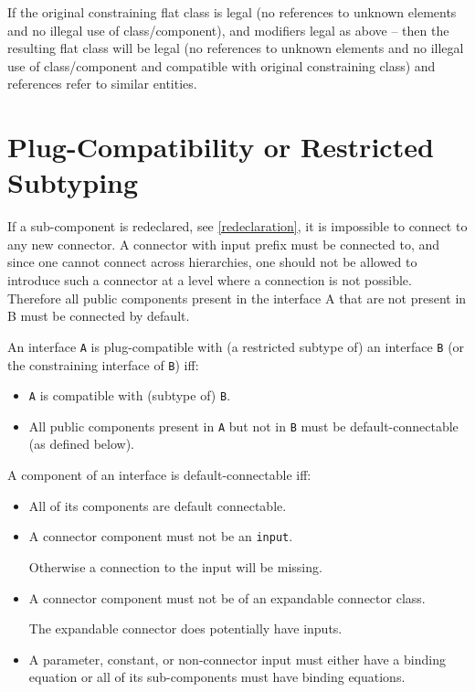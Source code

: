\begin{nonnormative}
If the original constraining flat class is legal (no references
to unknown elements and no illegal use of class/component), and
modifiers legal as above -- then the resulting flat class will be legal
(no references to unknown elements and no illegal use of class/component
and compatible with original constraining class) and references refer to
similar entities.
\end{nonnormative}

\section{Plug-Compatibility or Restricted Subtyping}

\begin{nonnormative}
If a sub-component is redeclared, see \autoref{redeclaration}, it is
impossible to connect to any new connector. A connector with input
prefix must be connected to, and since one cannot connect across
hierarchies, one should not be allowed to introduce such a connector at
a level where a connection is not possible. Therefore all public
components present in the interface A that are not present in B must be
connected by default.
\end{nonnormative}

\begin{definition}[Plug-compatibility (= restricted subtyping)]
An interface \lstinline!A! is plug-compatible with (a restricted subtype of) an
interface \lstinline!B! (or the constraining interface of \lstinline!B!) iff:
\begin{itemize}
\item
  \lstinline!A! is compatible with (subtype of) \lstinline!B!.
\item
  All public components present in \lstinline!A! but not in \lstinline!B! must be
  default-connectable (as defined below).
\end{itemize}
\end{definition}

\begin{definition}
A component of an interface is default-connectable iff:
\begin{itemize}
\item
  All of its components are default connectable.
\item
  A connector component must not be an \lstinline!input!.
  \begin{nonnormative}
  Otherwise a connection to the input will be missing.
  \end{nonnormative}
\item
  A connector component must not be of an expandable connector class.
  \begin{nonnormative}
  The expandable connector does potentially have inputs.
  \end{nonnormative}
\item
  A parameter, constant, or non-connector input must either have a
  binding equation or all of its sub-components must have binding
  equations.
\end{itemize}
\end{definition}

